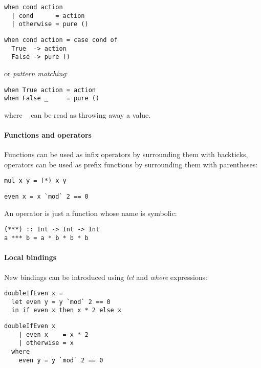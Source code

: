 \begin{multicols}{2}
\begin{verbatim}
when cond action
  | cond      = action
  | otherwise = pure ()
\end{verbatim}
\begin{verbatim}
when cond action = case cond of
  True  -> action
  False -> pure ()
\end{verbatim}
\end{multicols}

\noindent
or \emph{pattern matching}:

\begin{verbatim}
when True action = action
when False _     = pure ()
\end{verbatim}

\noindent
where \verb|_| can be read as throwing away a value.

\paragraph{Functions and operators}
Functions can be used as infix operators by surrounding them with backticks,
operators can be used as prefix functions by surrounding them with parentheses:

\begin{multicols}{2}
\begin{verbatim}
mul x y = (*) x y
\end{verbatim}
\begin{verbatim}
even x = x `mod` 2 == 0
\end{verbatim}
\end{multicols}

An operator is just a function whose name is symbolic:

\begin{verbatim}
(***) :: Int -> Int -> Int
a *** b = a * b * b * b
\end{verbatim}

\paragraph{Local bindings}
New bindings can be introduced using \emph{let} and \emph{where} expressions:

\begin{multicols}{2}
\begin{verbatim}
doubleIfEven x =
  let even y = y `mod` 2 == 0
  in if even x then x * 2 else x
\end{verbatim}
\columnbreak
\begin{verbatim}
doubleIfEven x
    | even x    = x * 2
    | otherwise = x
  where
    even y = y `mod` 2 == 0
\end{verbatim}
\end{multicols}


